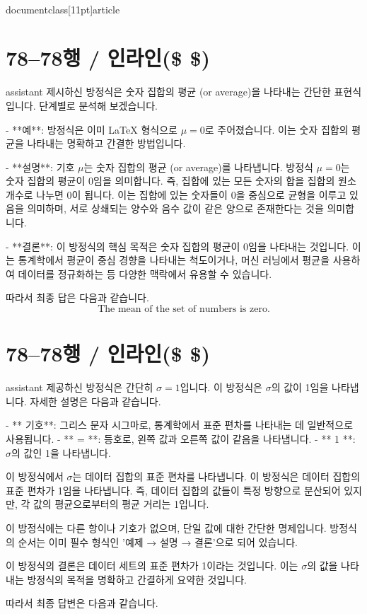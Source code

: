 \\documentclass[11pt]{article}
\begin{document}
\section*{78–78행 / 인라인(\$ \$)}
assistant
제시하신 방정식은 숫자 집합의 평균 (or average)을 나타내는 간단한 표현식입니다. 단계별로 분석해 보겠습니다.

- **예**: 방정식은 이미 LaTeX 형식으로 \(\mu = 0\)로 주어졌습니다. 이는 숫자 집합의 평균을 나타내는 명확하고 간결한 방법입니다.

- **설명**: 기호 \(\mu\)는 숫자 집합의 평균 (or average)를 나타냅니다. 방정식 \(\mu = 0\)는 숫자 집합의 평균이 0임을 의미합니다. 즉, 집합에 있는 모든 숫자의 합을 집합의 원소 개수로 나누면 0이 됩니다. 이는 집합에 있는 숫자들이 0을 중심으로 균형을 이루고 있음을 의미하며, 서로 상쇄되는 양수와 음수 값이 같은 양으로 존재한다는 것을 의미합니다.

- **결론**: 이 방정식의 핵심 목적은 숫자 집합의 평균이 0임을 나타내는 것입니다. 이는 통계학에서 평균이 중심 경향을 나타내는 척도이거나, 머신 러닝에서 평균을 사용하여 데이터를 정규화하는 등 다양한 맥락에서 유용할 수 있습니다.

따라서 최종 답은 다음과 같습니다.
\[
\boxed{\text{The mean of the set of numbers is zero.}}
\]

\section*{78–78행 / 인라인(\$ \$) }
assistant
제공하신 방정식은 간단히 \(\sigma = 1\)입니다. 이 방정식은 \(\sigma\)의 값이 1임을 나타냅니다. 자세한 설명은 다음과 같습니다.

- ** 기호**: 그리스 문자 시그마로, 통계학에서 표준 편차를 나타내는 데 일반적으로 사용됩니다.
- ** = **: 등호로, 왼쪽 값과 오른쪽 값이 같음을 나타냅니다.
- ** 1 **: \(\sigma\)의 값인 1을 나타냅니다.

이 방정식에서 \(\sigma\)는 데이터 집합의 표준 편차를 나타냅니다. 이 방정식은 데이터 집합의 표준 편차가 1임을 나타냅니다. 즉, 데이터 집합의 값들이 특정 방향으로 분산되어 있지만, 각 값의 평균으로부터의 평균 거리는 1입니다.

이 방정식에는 다른 항이나 기호가 없으며, 단일 값에 대한 간단한 명제입니다. 방정식의 순서는 이미 필수 형식인 '예제 → 설명 → 결론'으로 되어 있습니다.

이 방정식의 결론은 데이터 세트의 표준 편차가 1이라는 것입니다. 이는 \(\sigma\)의 값을 나타내는 방정식의 목적을 명확하고 간결하게 요약한 것입니다.

따라서 최종 답변은 다음과 같습니다.
\end{document}
